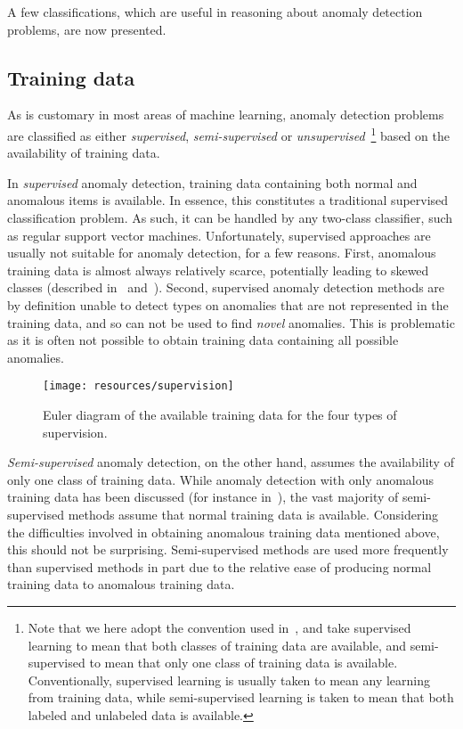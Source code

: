 A few classifications, which are useful in reasoning about anomaly detection problems, are now presented.

\subsection{Training data}
\label{sect:training_data}

As is customary in most areas of machine learning, anomaly detection problems are classified as either \emph{supervised}, \emph{semi-supervised} or \emph{unsupervised}~\footnote{Note that we here adopt the convention used in~\cite{chandola}, and take supervised learning to mean that both classes of training data are available, and semi-supervised to mean that only one class of training data is available. Conventionally, supervised learning is usually taken to mean any learning from training data, while semi-supervised learning is taken to mean that both labeled and unlabeled data is available.} based on the availability of training data.

In \emph{supervised} anomaly detection, training data containing both normal and anomalous items is available. In essence, this constitutes a traditional supervised classification problem. As such, it can be handled by any two-class classifier, such as regular support vector machines. Unfortunately, supervised approaches are usually not suitable for anomaly detection, for a few reasons. First, anomalous training data is almost always relatively scarce, potentially leading to skewed classes (described in~\cite{phua} and~\cite{joshi}). Second, supervised anomaly detection methods are by definition unable to detect types on anomalies that are not represented in the training data, and so can not be used to find \emph{novel} anomalies. This is problematic as it is often not possible to obtain training data containing all possible anomalies.

\begin{wrapfigure}{o}{0.5\textwidth}
    \changecaptionwidth
    \centering
    \texttt{[image: resources/supervision]}
    \caption{Euler diagram of the available training data for the four types of supervision.}
\label{fig:supervision}
\end{wrapfigure}

\emph{Semi-supervised} anomaly detection, on the other hand, assumes the availability of only one class of training data. While anomaly detection with only anomalous training data has been discussed (for instance in~\cite{dasgupta}), the vast majority of semi-supervised methods assume that normal training data is available. Considering the difficulties involved in obtaining anomalous training data mentioned above, this should not be surprising. Semi-supervised methods are used more frequently than supervised methods in part due to the relative ease of producing normal training data to anomalous training data.

